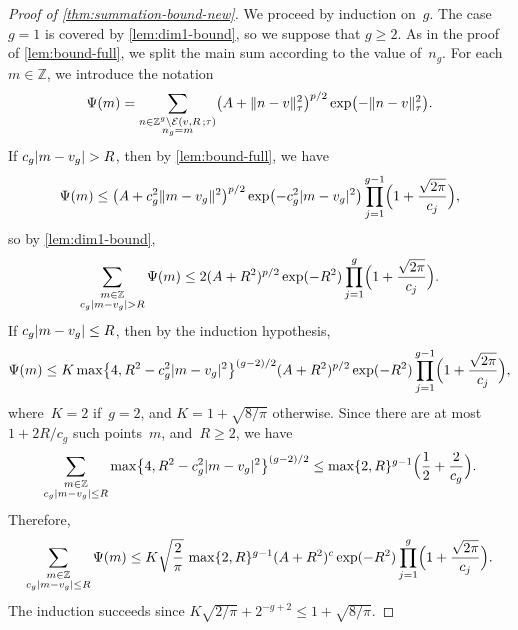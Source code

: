 \documentclass[12pt,oneside]{amsart}
\numberwithin{equation}{section}
\theoremstyle{definition}
\newcommand{\Z}{\mathbb{Z}}
\newcommand{\eld}[3]{\ensuremath{\mathcal{E}(#1, #2\,; #3)}}
\DeclarePairedDelimiter{\abs}{|}{|}
\DeclarePairedDelimiter{\paren}{(}{)}
\DeclarePairedDelimiter{\braces}{\{}{\}}
\DeclarePairedDelimiter{\norm}{\|}{\|}
\begin{document}
\begin{proof}[Proof of \cref{thm:summation-bound-new}] We proceed by induction
  on~$g$. The case $g=1$ is covered by \cref{lem:dim1-bound}, so we suppose
  that $g\geq 2$. As in the proof of \cref{lem:bound-full}, we split the main
  sum according to the value of~$n_g$. For each~$m\in \Z$, we introduce the
  notation
  \begin{displaymath}
    \Psi(m) = \sum_{\substack{n\in \Z^g \setminus \eld{v}{R}{\tau}\\ n_g = m}}
    \paren[\big]{A + \norm{n - v}_\tau^2}^{p/2} \exp\paren[\big]{-\norm{n - v}_\tau^2}.
  \end{displaymath}
  If $c_g\abs{m - v_g} > R$, then by \cref{lem:bound-full}, we have
  \begin{displaymath}
    \Psi(m) \leq \paren[\big]{A + c_g^2 \norm{m - v_g}^2}^{p/2} \exp\paren[\big]{- c_g^2\abs{m - v_g}^2}
    \prod_{j=1}^{g-1} \paren[\Big]{1 + \frac{\sqrt{2\pi}}{c_j}},
  \end{displaymath}
  so by \cref{lem:dim1-bound},
  \begin{displaymath}
    \sum_{\substack{m\in \Z\\ c_g\abs{m - v_g} > R}} \Psi(m) \leq 2 (A + R^2)^{p/2} \exp(-R^2)
    \prod_{j=1}^{g} \paren[\Big]{1 + \frac{\sqrt{2\pi}}{c_j}}.
  \end{displaymath}
  If $c_g \abs{m - v_g} \leq R$, then by the induction hypothesis,
  \begin{displaymath}
    \Psi(m) \leq K \max\braces[\big]{4, R^2 - c_g^2 \abs{m-v_g}^2}^{(g-2)/2}
    (A + R^2)^{p/2} \exp(-R^2) \prod_{j=1}^{g-1} \paren[\Big]{1 + \frac{\sqrt{2\pi}}{c_j}},
  \end{displaymath}
  where~$K = 2$ if~$g = 2$, and $K = 1 + \sqrt{8/\pi}$
  otherwise.  Since there are at most~$1 + 2R/c_g$ such points~$m$,
  and~$R\geq 2$, we have
  \begin{displaymath}
    \sum_{\substack{m\in \Z\\ c_g\abs{m - v_g}\leq R}} \max\braces[\big]{4, R^2 - c_g^2 \abs{m-v_g}^2}^{(g-2)/2}
      \leq \max\{2, R\}^{g-1} \paren[\Big]{\frac 12 + \frac{2}{c_g}}.
  \end{displaymath}
  Therefore,
  \begin{displaymath}
    \sum_{\substack{m\in \Z\\ c_g\abs{m - v_g} \leq R}} \Psi(m)
    \leq K \sqrt{\frac{2}{\pi}}\, \max\{2,R\}^{g-1} (A+R^2)^c \exp(-R^2)
    \prod_{j=1}^{g} \paren[\Big]{1 + \frac{\sqrt{2\pi}}{c_j}}.
  \end{displaymath}
  The induction succeeds since
  $K \sqrt{2/\pi} + 2^{-g+2}\leq 1 + \sqrt{8/\pi}$.
\end{proof}
\end{document}
